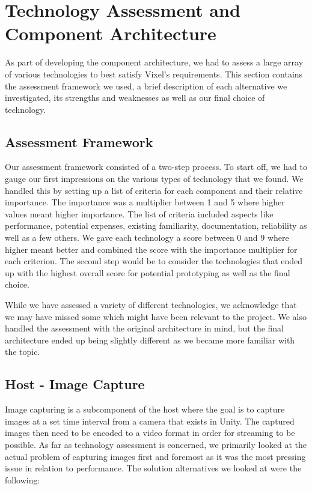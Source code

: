 \section{Technology Assessment and Component Architecture}
As part of developing the component architecture, we had to assess a large array of various technologies to best satisfy Vixel's requirements. This section contains the assessment framework we used, a brief description of each alternative we investigated, its strengths and weaknesses as well as our final choice of technology.

\subsection{Assessment Framework}
Our assessment framework consisted of a two-step process. To start off, we had to gauge our first impressions on the various types of technology that we found.
We handled this by setting up a list of criteria for each component and their relative importance. The importance was a multiplier between 1 and 5 where higher values meant higher importance. The list of criteria included aspects like performance, potential expenses, existing familiarity, documentation, reliability as well as a few others. We gave each technology a score between 0 and 9 where higher meant better and combined the score with the importance multiplier for each criterion. The second step would be to consider the technologies that ended up with the highest overall score for potential prototyping as well as the final choice. 

While we have assessed a variety of different technologies, we acknowledge that we may have missed some which might have been relevant to the project. We also handled the assessment with the original architecture in mind, but the final architecture ended up being slightly different as we became more familiar with the topic.  

\subsection{Host - Image Capture}
Image capturing is a subcomponent of the host where the goal is to capture images at a set time interval from a camera that exists in Unity. The captured images then need to be encoded to a video format in order for streaming to be possible. As far as technology assessment is concerned, we primarily looked at the actual problem of capturing images first and foremost as it was the most pressing issue in relation to performance. The solution alternatives we looked at were the following:

